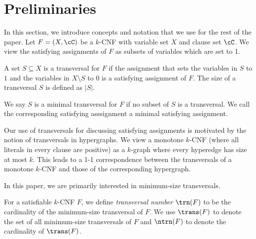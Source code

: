 \section{Preliminaries} \label{sec:preliminaries}

In this section, we introduce concepts and 
notation that we use for the rest of the paper.
Let $F = (X, \cC)$ be a $k$-CNF with variable set $X$ and clause set $\cC$. We view the satisfying assignments of $F$ as 
subsets of variables which are set to 1.

\begin{definition}[Transversals]
A set $S\subseteq X$ is a transversal for $F$ if the assignment that sets
the variables in $S$ to $1$ and the variables in 
$X\setminus S$ to $0$ is a satisfying assignment of $F$.
The size of a transversal $S$ is defined as $|S|$.
\end{definition}

We say $S$ is a minimal transversal for $F$ if no subset of $S$ is a transversal. We call the corresponding satisfying asssignment a minimal satisfying assignment.

Our use of transversals for discussing satisfying assignments is
motivated by the notion of transversals in hypergraphs.
We view a monotone 
$k$-CNF 
(where all literals in every clause are positive) 
as a $k$-graph where every hyperedge has size at most $k$. 
This leads to a 1-1 correspondence
between the transversals of a monotone
$k$-CNF 
and those  of the corresponding hypergraph.

In this paper, we are primarily interested in 
minimum-size transversals.

\begin{definition}
For a satisfiable $k$-CNF $F$, we define \emph{transversal number} $\trn(F)$ to be the cardinality of the minimum-size transversal of $F$.  
We use $\trans(F)$ to denote the set of all minimum-size
transversals of $F$
and $\ntrn(F)$ to denote the cardinality of 
$\trans(F)$.
\end{definition}


